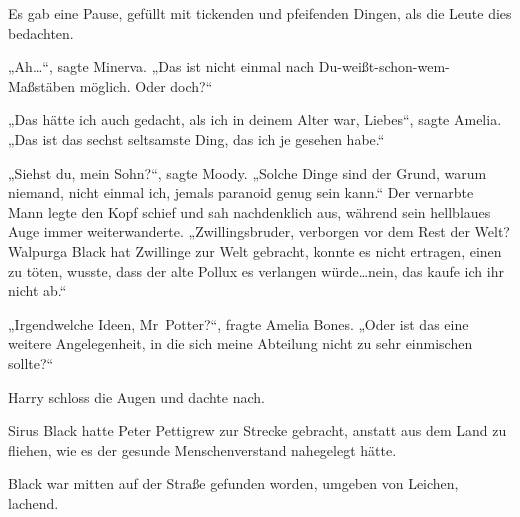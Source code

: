 Es gab eine Pause, gefüllt mit tickenden und pfeifenden Dingen, als die Leute dies bedachten.

„Ah…“, sagte Minerva. „Das ist nicht einmal nach Du-weißt-schon-wem-Maßstäben möglich. Oder doch?“

„Das hätte ich auch gedacht, als ich in deinem Alter war, Liebes“, sagte Amelia. „Das ist das sechst seltsamste Ding, das ich je gesehen habe.“

„Siehst du, mein Sohn?“, sagte Moody. „Solche Dinge sind der Grund, warum niemand, nicht einmal ich, jemals paranoid genug sein kann.“
Der vernarbte Mann legte den Kopf schief und sah nachdenklich aus, während sein hellblaues Auge immer weiterwanderte.
„Zwillingsbruder, verborgen vor dem Rest der Welt? Walpurga Black hat Zwillinge zur Welt gebracht, konnte es nicht ertragen, einen zu töten, wusste, dass der alte Pollux es verlangen würde…nein, das kaufe ich ihr nicht ab.“

„Irgendwelche Ideen, Mr~Potter?“, fragte Amelia Bones. „Oder ist das eine weitere Angelegenheit, in die sich meine Abteilung nicht zu sehr einmischen sollte?“

Harry schloss die Augen und dachte nach.

Sirus Black hatte Peter Pettigrew zur Strecke gebracht, anstatt aus dem Land zu fliehen, wie es der gesunde Menschenverstand nahegelegt hätte.

Black war mitten auf der Straße gefunden worden, umgeben von Leichen, lachend.

